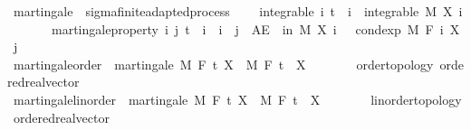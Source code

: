 \begin{isabellebody}
\begin{isamarkuptext}
\end{isamarkuptext}\isamarkuptrue%
\isamarkupfalse%
\ martingale\ {\isacharequal}{\kern0pt}\ sigma{\isacharunderscore}{\kern0pt}finite{\isacharunderscore}{\kern0pt}adapted{\isacharunderscore}{\kern0pt}process\ {\isacharplus}{\kern0pt}\isanewline
\ \ \ integrable{\isacharcolon}{\kern0pt}\ {\isachardoublequoteopen}{\isasymAnd}i{\isachardot}{\kern0pt}\ t\ {\isasymle}\ i\ {\isasymLongrightarrow}\ integrable\ M\ {\isacharparenleft}{\kern0pt}X\ i{\isacharparenright}{\kern0pt}{\isachardoublequoteclose}\isanewline
\ \ \ \ \ \ \ martingale{\isacharunderscore}{\kern0pt}property{\isacharcolon}{\kern0pt}\ {\isachardoublequoteopen}{\isasymAnd}i\ j{\isachardot}{\kern0pt}\ t\ {\isasymle}\ i\ {\isasymLongrightarrow}\ i\ {\isasymle}\ j\ {\isasymLongrightarrow}\ AE\ {\isasymxi}\ in\ M{\isachardot}{\kern0pt}\ X\ i\ {\isasymxi}\ {\isacharequal}{\kern0pt}\ cond{\isacharunderscore}{\kern0pt}exp\ M\ {\isacharparenleft}{\kern0pt}F\ i{\isacharparenright}{\kern0pt}\ {\isacharparenleft}{\kern0pt}X\ j{\isacharparenright}{\kern0pt}\ {\isasymxi}{\isachardoublequoteclose}\isanewline
\isanewline
{}\isamarkupfalse%
\ martingale{\isacharunderscore}{\kern0pt}order\ {\isacharequal}{\kern0pt}\ martingale\ M\ F\ t\ X\ \ M\ F\ t\ \ X\ {\isacharcolon}{\kern0pt}{\isacharcolon}{\kern0pt}\ {\isachardoublequoteopen}{\isacharunderscore}{\kern0pt}\ {\isasymRightarrow}\ {\isacharunderscore}{\kern0pt}\ {\isasymRightarrow}\ {\isacharunderscore}{\kern0pt}\ {\isacharcolon}{\kern0pt}{\isacharcolon}{\kern0pt}\ {\isacharbraceleft}{\kern0pt}order{\isacharunderscore}{\kern0pt}topology{\isacharcomma}{\kern0pt}\ ordered{\isacharunderscore}{\kern0pt}real{\isacharunderscore}{\kern0pt}vector{\isacharbraceright}{\kern0pt}{\isachardoublequoteclose}\isanewline
{}\isamarkupfalse%
\ martingale{\isacharunderscore}{\kern0pt}linorder\ {\isacharequal}{\kern0pt}\ martingale\ M\ F\ t\ X\ \ M\ F\ t\ \ X\ {\isacharcolon}{\kern0pt}{\isacharcolon}{\kern0pt}\ {\isachardoublequoteopen}{\isacharunderscore}{\kern0pt}\ {\isasymRightarrow}\ {\isacharunderscore}{\kern0pt}\ {\isasymRightarrow}\ {\isacharunderscore}{\kern0pt}\ {\isacharcolon}{\kern0pt}{\isacharcolon}{\kern0pt}\ {\isacharbraceleft}{\kern0pt}linorder{\isacharunderscore}{\kern0pt}topology{\isacharcomma}{\kern0pt}\ ordered{\isacharunderscore}{\kern0pt}real{\isacharunderscore}{\kern0pt}vector{\isacharbraceright}{\kern0pt}{\isachardoublequoteclose}\isanewline

\end{isabellebody}
